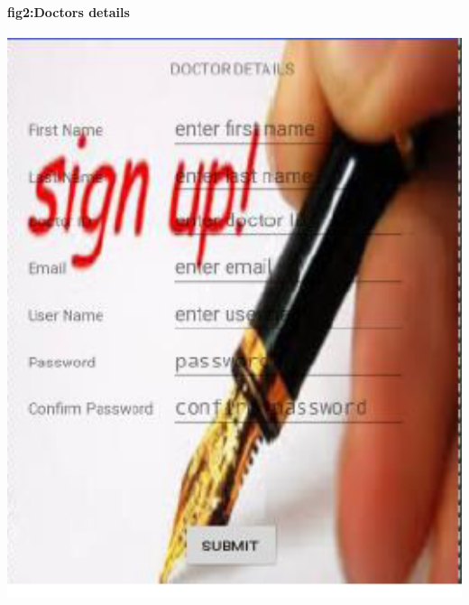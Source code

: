 \documentclass[12pt,]{article}
\begin{document}
\paragraph{fig2:Doctors details }
\includegraphics[width=1.0\textwidth]{./capture1}\\[0.1in]
\end{document}
